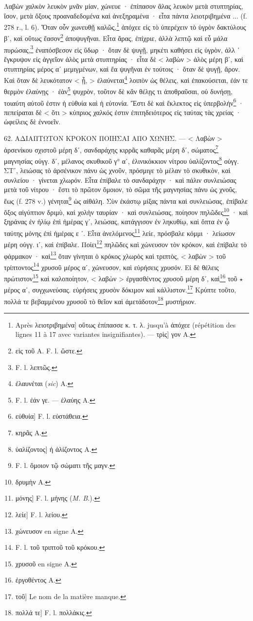 \documentclass[a4paper, 11pt, oneside, polutonikogreek, french]{article}
\begin{document}
Λαβὼν χαλκὸν λευκὸν μνᾶν μίαν, χώνευε · ἐπίπασον ἅλας λευκὸν μετὰ στυπτηρίας, ἴσον, μετὰ ὄξους προαναδεδομένα καὶ ἀνεξηραμένα · εἶτα πάντα λειοτριβημένα ... (f. 278 r., l. 6). Ὅταν οὖν χωνευθῇ καλῶς,\footnote{Après λειοτριβημένα] οὕτως ἐπίπασσε κ. τ. λ. jusqu'à ἀπόχεε (répétition des lignes 11 à 17 avec variantes insignifiantes). --- τρὶς] γον A.} ἀπόχεε εἰς τὸ ὑπερέχειν τὸ ὑγρὸν δακτύλους βʹ, καὶ οὕτως ἔασον\footnote{εἰς τοῦ A. F. l. ὥστε.} ἀποψυγῆναι. Εἶτα ἄρας, ἐπίχριε, ἀλλὰ λεπτῷ καὶ εὖ μάλα πυρώσας,\footnote{F. l. λεπτῶς.} ἐναπόσβεσον εἰς ὕδωρ · ὅταν δὲ ψυγῇ, μηκέτι καθήσει εἰς ὑγρὸν, ἀλλ ᾽ ἔγκρυψον εἰς ἀγγεῖον ἀλὸς μετὰ στυπτηρίας · εἶτα δὲ < λαβὼν > ἀλὸς μέρη βʹ, καὶ στυπτηρίας μέρος αʹ μεμιγμένων, καὶ ἔα ψυγῆναι ἐν τούτοις · ὅταν δὲ ψυγῇ, ἄρον. Καὶ ὅταν δὲ λευκότατον < ᾖ, > ἐλαύνεται\footnote{ἐλαυνέται (\emph{sic}) A.} λοιπὸν ὡς θέλεις, καὶ ἐπακούσεται, ἐάν τε θερμὸν ἐλαύνῃς · ἐὰν\footnote{F. l. ἐάν γε. --- ἐλαύης A.} ψυχρὸν, τοῦτον δὲ κἂν θέλῃς τι ἀποθραῦσαι, οὐ δυνήσῃ, τοιαύτη αὐτοῦ ἐστιν ἡ εὐθυία καὶ ἡ εὐτονία. Ἔστι δὲ καὶ ἔκλεκτος εἰς ὑπερβολήν\footnote{εὐθυία] F. l. εὐστάθεια.} · πεπείραται δὲ < ὅτι > κύπριος χαλκός ἐστιν ἐπιτηδειότερος εἰς ταύτας τὰς χρείας · ὠφείλεις δὲ ἐννοεῖν.

62. ΑΔΙΑΠΤΩΤΟΝ ΚΡΟΚΟΝ ΠΟΙΗΣΑΙ ΑΠΟ ΧΩΝΗΣ. --- < Λαβὼν > ἀρσενίκου σχιστοῦ μέρη δʹ, σανδαράχης κιρρᾶς καθαρᾶς μέρη δʹ, σώματος\footnote{κηρᾶς A.} μαγνησίας οὐγγ. δʹ, μέλανος σκυθικοῦ γ° αʹ, ἑλινικόκκιον νίτρου ὑαλίζοντος\footnote{ὑαλίζοντος] ἡ ἁλίζοντος A.} οὐγγ. ΣΤʹ, λειώσας τὸ ἀρσένικον πάνυ ὡς χνοῦν, πρόσμιγε τὸ μέλαν τὸ σκυθικὸν, καὶ συνλείου · γίνεται χλωρόν. Εἶτα ἐπίβαλε τὸ σανδαράχην · καὶ πάλιν συνλειώσας μετὰ τοῦ νίτρου · ἔστι τὸ πρῶτον ὅμοιον, τὸ σῶμα τῆς μαγνησίας πάνυ ὡς χνοῦς, ἕως (f. 278 v.) γένηται\footnote{F. l. ὅμοιον τῷ σώματι τῆς μαγν.} ὡς αἰθάλη. Σὺν ἐκάστῳ μίξας πάντα καὶ συνλειώσας, ἐπίβαλε ὄξος αἰγύπτιον δριμὺ, καὶ χολὴν ταυρίαν · καὶ συνλειώσας, ποίησον πηλῶδες\footnote{δρυμὴν A.} · καὶ ξηράνας ἐν ἡλίῳ ἐπὶ ἡμέρας γʹ, λειώσας, κατάγγισον ἐν ληκυθίῳ, καὶ ὄπτα ἐν ᾧ ταύτης μόνης ἐπὶ ἡμέρας ε ᾽. Εἶτα ἀνελόμενος\footnote{μόνης] F. l. μήνης (\emph{M. B.}).} λείε, πρόσβαλε κόμμι · λείωσον μέρη οὐγγ. ιʹ, καὶ ἐπίβαλε. Ποίει\footnote{λείε] F. l. λείου.} πηλῶδες καὶ χώνευσον τὸν κρόκον, καὶ ἐπίβαλε τὸ φάρμακον · καὶ\footnote{χώνευσον en signe A.} ὅταν γίνηται ὁ κρόκος χλωρὸς καὶ τριπτὸς, < λαβὼν > τοῦ τρίπτοντος\footnote{F. l. τοῦ τριπτοῦ τοῦ κρόκου.} χρυσοῦ μέρος αʹ, χώνευσον, καὶ εὑρήσεις χρυσόν. Εἰ δὲ θέλεις πρώτιστον\footnote{χρυσοῦ en signe A.} καὶ καλοποίητον, < λαβὼν > ἐργασθέντος χρυσοῦ μέρη δʹ, καὶ\footnote{ἐργοθέντος A.} τοῦ $\star$ μέρος αʹ, συγχωνεύσας. εὑρήσεις χρυσὸν δόκιμον καὶ κάλλιστον.\footnote{τοῦ] Le nom de la matière manque.} Κρύπτε τοῦτο, πολλά τε βεβαμμένου χρυσοῦ τὸ θεῖον καὶ ἀμετάδοτον\footnote{πολλά τε] F. l. πολλάκις.} μυστήριον.
\end{document}
